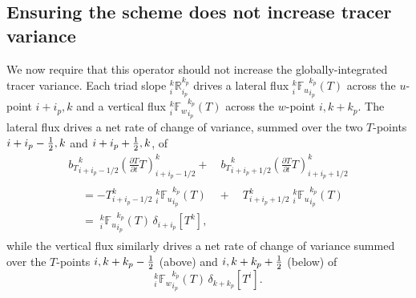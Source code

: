 \documentclass[../main/NEMO_manual]{subfiles}
\begin{document}
\subsection{Ensuring the scheme does not increase tracer variance}
\label{subsec:TRIADS_variance}

We now require that this operator should not increase the globally-integrated tracer variance.
Each triad slope $_i^k\mathbb{R}_{i_p}^{k_p}$ drives a lateral flux $_i^k{\mathbb{F}_u}_{i_p}^{k_p} (T)$ across
the $u$-point $i+i_p,k$ and a vertical flux $_i^k{\mathbb{F}_w}_{i_p}^{k_p} (T)$ across the $w$-point $i,k+k_p$.
The lateral flux drives a net rate of change of variance,
summed over the two $T$-points $i+i_p-\textstyle \frac{1}{2},k$ and $i+i_p+\textstyle \frac{1}{2},k$, of
\begin{multline}
  {b_T}_{i+i_p-1/2}^k\left(\frac{\partial T}{\partial t}T\right)_{i+i_p-1/2}^k+
  \quad {b_T}_{i+i_p+1/2}^k\left(\frac{\partial T}{\partial
      t}T\right)_{i+i_p+1/2}^k \\
  \begin{aligned}
    &= -T_{i+i_p-1/2}^k{\;} _i^k{\mathbb{F}_u}_{i_p}^{k_p} (T) \quad + \quad  T_{i+i_p+1/2}^k
    {\;}_i^k{\mathbb{F}_u}_{i_p}^{k_p} (T) \\
    &={\;} _i^k{\mathbb{F}_u}_{i_p}^{k_p} (T)\,\delta_{i+ i_p}[T^k], \label{eq:TRIADS_dvar_iso_i}
  \end{aligned}
\end{multline}
while the vertical flux similarly drives a net rate of change of variance summed over
the $T$-points $i,k+k_p-\textstyle \frac{1}{2}$ (above) and $i,k+k_p+\textstyle \frac{1}{2}$ (below) of
\begin{equation}
  \label{eq:TRIADS_dvar_iso_k}
  _i^k{\mathbb{F}_w}_{i_p}^{k_p} (T) \,\delta_{k+ k_p}[T^i].
\end{equation}
\end{document}
